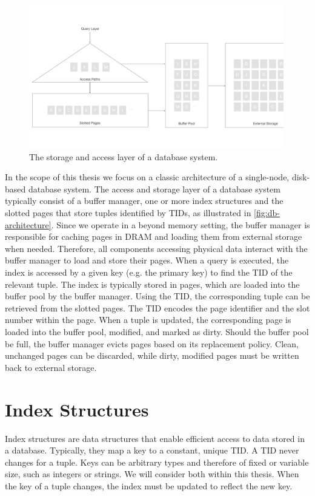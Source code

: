 \begin{figure}[htpb]
  \centering
  \includegraphics[width=0.99\textwidth]{figures/db_architecture.pdf}
  \caption{The storage and access layer of a database system.}
  \label{fig:db-architecture}
\end{figure}

In the scope of this thesis we focus on a classic architecture of a single-node, disk-based database system.
The access and storage layer of a database system typically consist of a buffer manager, one or more index structures and the slotted pages that store tuples identified by \ac{TID}s, as illustrated in \autoref{fig:db-architecture}.
Since we operate in a beyond memory setting, the buffer manager is responsible for caching pages in \ac{DRAM} and loading them from external storage when needed.
Therefore, all components accessing physical data interact with the buffer manager to load and store their pages.
When a query is executed, the index is accessed by a given key (e.g. the primary key) to find the \ac{TID} of the relevant tuple.
The index is typically stored in pages, which are loaded into the buffer pool by the buffer manager.
Using the \ac{TID}, the corresponding tuple can be retrieved from the slotted pages.
The \ac{TID} encodes the page identifier and the slot number within the page.
When a tuple is updated, the corresponding page is loaded into the buffer pool, modified, and marked as dirty.
Should the buffer pool be full, the buffer manager evicts pages based on its replacement policy.
Clean, unchanged pages can be discarded, while dirty, modified pages must be written back to external storage.


\section{Index Structures}
Index structures are data structures that enable efficient access to data stored in a database.
Typically, they map a key to a constant, unique \ac{TID}. A \ac{TID} never changes for a tuple.
Keys can be arbitrary types and therefore of fixed or variable size, such as integers or strings.
We will consider both within this thesis.
When the key of a tuple changes, the index must be updated to reflect the new key.

